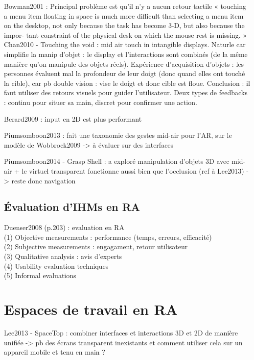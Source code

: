 Bowman2001 : Principal problème est qu'il n'y a aucun retour tactile « touching a menu item floating in space is much more difficult than selecting a menu item on the desktop, not only because the task has become 3-D, but also because the impor- tant constraint of the physical desk on which the mouse rest is missing. »\\
Chan2010 - Touching the void : mid air touch in intangible displays. Naturle car simplifie la manip d'objet : le display et l'interactions sont combinés (de la même manière qu'on manipule des objets réels). Expérience d'acquisition d'objets : les personnes évaluent mal la profondeur de leur doigt (donc quand elles ont touché la cible), car pb double vision : vise le doigt et donc cible est floue. Conclusion : il faut utiliser des retours visuels pour guider l'utilisateur. Deux types de feedbacks : continu pour situer sa main, discret pour confirmer une action.

Berard2009 : input en 2D est plus performant

Piumsomboon2013 : fait une taxonomie des gestes mid-air pour l'AR, sur le modèle de Wobbrock2009 -> à évaluer sur des interfaces

Piumsomboon2014 - Grasp Shell : a exploré manipulation d'objets 3D avec mid-air + le virtuel transparent fonctionne aussi bien que l'occlusion (ref à Lee2013) -> reste donc navigation

\subsection{Évaluation d'IHMs en RA}
Duenser2008 (p.203) : evaluation en RA\\
(1) Objective measurements : performance (temps, erreurs, efficacité)\\
(2) Subjective measurements : engagament, retour utilisateur\\
(3) Qualitative analysis : avis d'experts\\
(4) Usability evaluation techniques\\
(5) Informal evaluations


\section{Espaces de travail en RA}
Lee2013 - SpaceTop : combiner interfaces et interactions 3D et 2D de manière unifiée -> pb des écrans transparent inexistants et comment utiliser cela sur un appareil mobile et tenu en main ?

